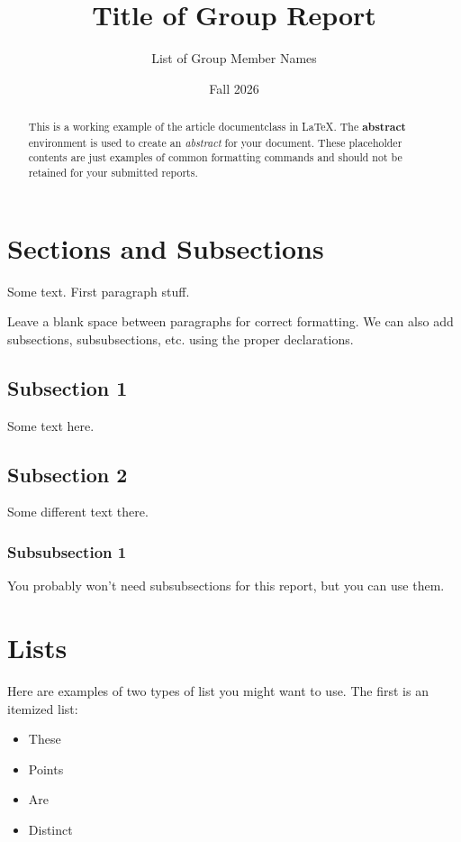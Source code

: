 \documentclass{article}%
\title{Title of Group Report}
\author{List of Group Member Names}
\date{Fall 2026} %
\begin{document}
\maketitle%

\begin{abstract}
This is a working example of the article documentclass in \LaTeX. The \textbf{abstract} environment is used to create an \textit{abstract} for your document. These placeholder contents are just examples of common formatting commands and should not be retained for your submitted reports.
\end{abstract}







\section{Sections and Subsections}
Some text. First paragraph stuff. 

Leave a blank space between paragraphs for correct formatting. We can also add subsections, subsubsections, etc. using the proper declarations.

\subsection{Subsection 1}
Some text here.
\subsection{Subsection 2}
Some different text there.
\subsubsection{Subsubsection 1}
You probably won't need subsubsections for this report, but you can use them.





\section{Lists}
Here are examples of two types of list you might want to use. The first is an itemized list:

\begin{itemize}
\item These
\item Points
\item Are
\item Distinct
\end{itemize}
\end{document}
